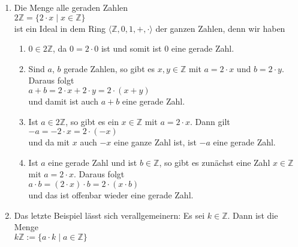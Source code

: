 \examples
\begin{enumerate}
\item Die Menge alle geraden Zahlen
      \\[0.2cm]
      \hspace*{1.3cm}
      $2 \mathbb{Z} = \{ 2 \cdot x \mid x \in \mathbb{Z} \}$
      \\[0.2cm]
      ist ein Ideal in dem Ring $\langle \mathbb{Z}, 0, 1, +, \cdot \rangle$ der ganzen
      Zahlen, denn wir haben
      \begin{enumerate}
      \item $0 \in 2\mathbb{Z}$, da $0 = 2 \cdot 0$ ist und somit ist $0$ eine gerade Zahl.
      \item Sind $a$, $b$ gerade Zahlen, so gibt es $x,y \in \mathbb{Z}$ mit $a = 2 \cdot x$ und 
            $b = 2 \cdot y$.  Daraus folgt
            \\[0.2cm]
            \hspace*{1.3cm}
            $a + b = 2 \cdot x + 2 \cdot y = 2 \cdot (x + y)$
            \\[0.2cm]
            und damit ist auch $a+b$ eine gerade Zahl.
      \item Ist $a \in 2\mathbb{Z}$, so gibt es ein $x \in \mathbb{Z}$ mit $a = 2 \cdot x$.  Dann gilt
            \\[0.2cm]
            \hspace*{1.3cm}
            $-a = - 2 \cdot x = 2 \cdot (-x)$
            \\[0.2cm]
            und da mit $x$ auch $-x$ eine ganze Zahl ist, ist $-a$ eine gerade Zahl.
      \item Ist $a$ eine gerade Zahl und ist $b \in \mathbb{Z}$, so gibt es zun\"{a}chst eine
            Zahl $x \in \mathbb{Z}$ mit $a = 2 \cdot x$.  Daraus folgt
            \\[0.2cm]
            \hspace*{1.3cm}
            $a \cdot b = (2 \cdot x) \cdot b = 2 \cdot (x \cdot b)$
            \\[0.2cm]
            und das ist offenbar wieder eine gerade Zahl.
      \end{enumerate}
\item Das letzte Beispiel l\"{a}sst sich verallgemeinern: Es sei $k \in \mathbb{Z}$. Dann ist die Menge 
      \\[0.2cm]
      \hspace*{1.3cm}
      $k\mathbb{Z} := \{ a \cdot k \mid a \in \mathbb{Z} \}$
      \\[0.2cm]

\end{enumerate}
